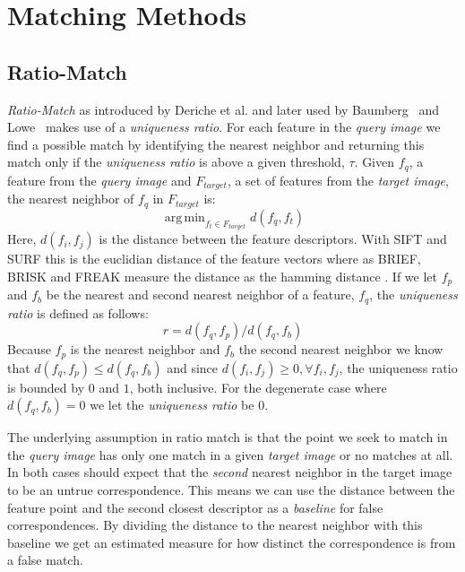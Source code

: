 \documentclass[journal]{IEEEtran}
\DeclareMathOperator*{\argmin}{arg\,min}
\begin{document}
\section{Matching Methods}
\label{S:MatchingMethods}
%
\subsection{Ratio-Match}
%
\emph{Ratio-Match} as introduced by Deriche et al.
\cite{deriche1994robust} and later used by 
Baumberg~\cite{baumberg2000reliable} and Lowe~\cite{lowe2004sift} makes 
use of a \emph{uniqueness ratio}. For each feature in the \emph{query 
image} we find a possible match by identifying the nearest neighbor and 
returning this match only if the \emph{uniqueness ratio} is above a 
given threshold, $\tau$. Given $f_q$, a feature from the \emph{query 
image} and $F_{target}$, a set of features from the \emph{target image}, 
the nearest neighbor of $f_q$ in $F_{target}$ is:
\begin{equation*}
    \argmin_{f_t \in F_{target}} d(f_q, f_t)
\end{equation*}
Here, $d(f_i, f_j)$ is the distance between the feature descriptors.  
With SIFT and SURF this is the euclidian distance of the feature vectors
\cite{lowe2004sift} \cite{bay2006surf} where as BRIEF, BRISK and FREAK 
measure the distance as the hamming distance \cite{leutenegger2011brisk} 
\cite{calonder2010brief} \cite{alahi2012freak}.  If we let $f_p$ and 
$f_b$ be the nearest and second nearest neighbor of a feature, $f_q$, 
the \emph{uniqueness ratio} is defined as follows:
\begin{equation*}
    r = d(f_q, f_p) / d(f_q, f_b)
\end{equation*}
Because $f_p$ is the nearest neighbor and $f_b$ the second nearest 
neighbor we know that $d(f_q, f_p) \leq d(f_q, f_b)$ and since $d(f_i, 
f_j) \geq 0, \forall f_i,f_j$, the uniqueness ratio is bounded by $0$ 
and $1$, both inclusive. For the degenerate case where $d(f_q, f_b) = 0$
we let the \emph{uniqueness ratio} be $0$.

The underlying assumption in ratio match is that the point we seek to 
match in the \emph{query image} has only one match in a given 
\emph{target image} or no matches at all. In both cases should expect 
that the \emph{second} nearest neighbor in the target image to be an 
untrue correspondence.  This means we can use the distance between the 
feature point and the second closest descriptor as a \emph{baseline} for 
false correspondences. By dividing the distance to the nearest neighbor 
with this baseline we get an estimated measure for how distinct the 
correspondence is from a false match.  
\end{document}
